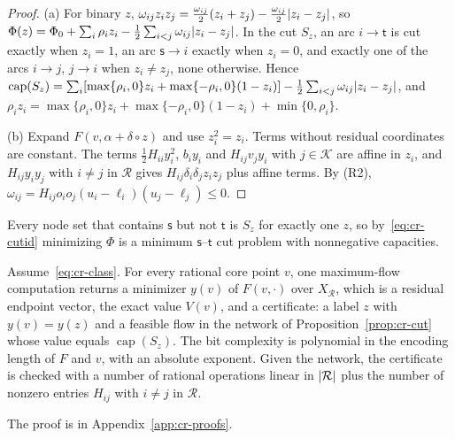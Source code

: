 \begin{proof}
(a) For binary $z$,
$\omega_{ij}z_iz_j=\frac{\omega_{ij}}2(z_i+z_j)-\frac{\omega_{ij}}2\lvert z_i-z_j\rvert$,
so $\Phi(z)=\Phi_0+\sum_i\rho_iz_i-\frac12\sum_{i<j}\omega_{ij}\lvert z_i-z_j\rvert$. In the
cut $S_z$, an arc $i\to\mathsf t$ is cut exactly when $z_i=1$, an arc
$\mathsf s\to i$ exactly when $z_i=0$, and exactly one of the arcs
$i\to j$, $j\to i$ when $z_i\ne z_j$, none otherwise. Hence
$\operatorname{cap}(S_z)=\sum_i[\max\{\rho_i,0\}z_i+\max\{-\rho_i,0\}(1-z_i)]
-\frac12\sum_{i<j}\omega_{ij}\lvert z_i-z_j\rvert$, and
$\rho_iz_i=\max\{\rho_i,0\}z_i+\max\{-\rho_i,0\}(1-z_i)+\min\{0,\rho_i\}$.

(b) Expand $F(v,\alpha+\delta\circ z)$ and use $z_i^2=z_i$. Terms without
residual coordinates are constant. The terms $\frac12H_{ii}y_i^2$, $b_iy_i$
and $H_{ij}v_jy_i$ with $j\in\mathcal K$ are affine in $z_i$, and
$H_{ij}y_iy_j$ with $i\ne j$ in $\mathcal R$ gives
$H_{ij}\delta_i\delta_jz_iz_j$ plus affine terms. By (R2),
$\omega_{ij}=H_{ij}o_io_j(u_i-\ell_i)(u_j-\ell_j)\le0$.
\end{proof}

Every node set that contains $\mathsf s$ but not $\mathsf t$ is $S_z$ for
exactly one $z$, so by~\eqref{eq:cr-cutid} minimizing $\Phi$ is a minimum
$\mathsf s$--$\mathsf t$ cut problem with nonnegative capacities.

\begin{theorem}\label{thm:cr-oracle}
Assume~\eqref{eq:cr-class}. For every rational core point $v$, one
maximum-flow computation returns a minimizer $y(v)$ of $F(v,\cdot)$ over
$X_{\mathcal R}$, which is a residual endpoint vector, the exact value
$V(v)$, and a certificate: a label $z$ with $y(v)=y(z)$ and a feasible flow
in the network of Proposition~\ref{prop:cr-cut} whose value equals
$\operatorname{cap}(S_z)$. The bit complexity is polynomial in the encoding
length of $F$ and $v$, with an absolute exponent. Given the network, the
certificate is checked with a number of rational operations linear in
$\lvert \mathcal R\rvert$ plus the number of nonzero entries $H_{ij}$ with
$i\ne j$ in $\mathcal R$.
\end{theorem}

The proof is in Appendix~\ref{app:cr-proofs}.

